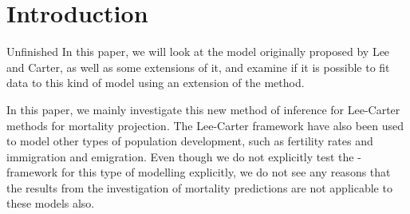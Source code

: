 \section{Introduction}
\textcolor{myDarkBlue}{Unfinished}
In this paper, we will look at the model originally proposed by Lee and Carter, as well as some extensions of it, and examine if it is possible to fit data to this kind of model using an extension of the \inla method. 

In this paper, we mainly investigate this new method of inference for Lee-Carter methods for mortality projection. The Lee-Carter framework have also been used to model other types of population development, such as fertility rates and immigration and emigration. Even though we do not explicitly test the \inlabru-framework for this type of modelling explicitly, we do not see any reasons that the results from the investigation of mortality predictions are not applicable to these models also. 